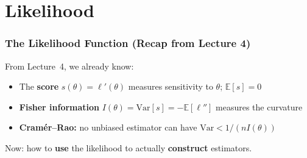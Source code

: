 \documentclass[aspectratio=169]{beamer}
\begin{document}
\section{Likelihood}

\begin{frame}
\frametitle{The Likelihood Function (Recap from Lecture 4)}

\small
\begin{center}
\end{center}

\vspace{0.1cm}
\pause
From Lecture~4, we already know:
\begin{itemize}\setlength{\itemsep}{1pt}
  \item The \textbf{score} $s(\theta) = \ell'(\theta)$ measures sensitivity to $\theta$; \;$\mathbb{E}[s] = 0$
  \item \textbf{Fisher information} $I(\theta) = \text{Var}[s] = -\mathbb{E}[\ell'']$ measures the curvature
  \item \textbf{Cram\'er--Rao:} no unbiased estimator can have $\text{Var} < 1/(nI(\theta))$
\end{itemize}

\vspace{0.05cm}
\centering Now: how to \textbf{use} the likelihood to actually \textbf{construct} estimators.
\end{frame}
\end{document}
